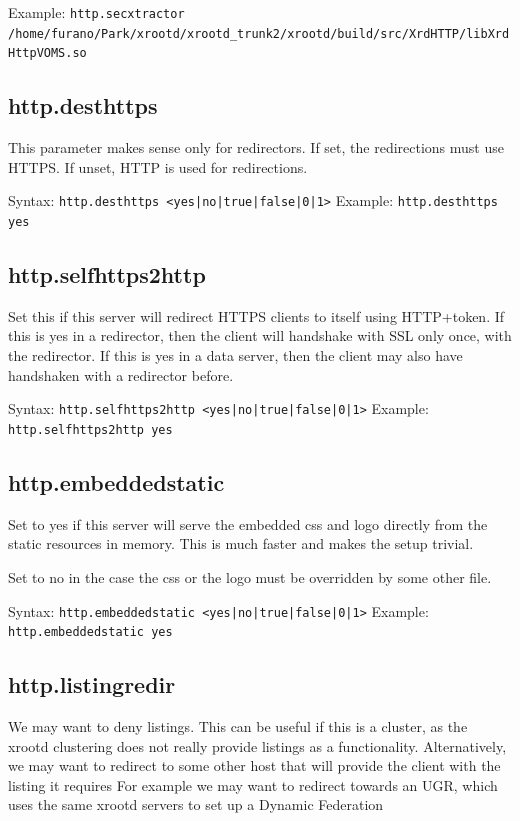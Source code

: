 \documentclass[12pt]{article} %
\begin{document}
Example:
\verb'http.secxtractor /home/furano/Park/xrootd/xrootd_trunk2/xrootd/build/src/XrdHTTP/libXrdHttpVOMS.so'

\subsection{http.desthttps}
This parameter makes sense only for redirectors.
If set, the redirections must use HTTPS. If unset, HTTP is used for redirections.

Syntax:
\verb'http.desthttps <yes|no|true|false|0|1>'
Example:
\verb'http.desthttps yes'

\subsection{http.selfhttps2http}

Set this if this server will redirect HTTPS clients to itself using HTTP+token.
If this is yes in a redirector, then the client will handshake with SSL only once, with the redirector.
If this is yes in a data server, then the client may also have handshaken with a redirector before.

Syntax:
\verb'http.selfhttps2http <yes|no|true|false|0|1>'
Example:
\verb'http.selfhttps2http yes'


\subsection{http.embeddedstatic}
Set to yes if this server will serve the embedded css and logo directly from
the static resources in memory. This is much faster and makes the
setup trivial.

Set to no in the case the css or the logo must be overridden by some other file.

Syntax:
\verb'http.embeddedstatic <yes|no|true|false|0|1>'
Example:
\verb'http.embeddedstatic yes'

\subsection{http.listingredir}
We may want to deny listings. This can be useful if this is a cluster,
as the xrootd clustering does not really provide listings as a functionality.
Alternatively, we may want to redirect to some other host that
will provide the client with the listing it requires
For example we may want to redirect towards an UGR, which uses the same
xrootd servers to set up a Dynamic Federation
\end{document}
